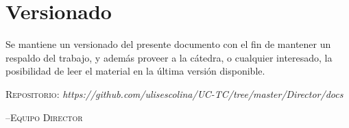 \documentclass{report}
\begin{document}
\newpage
\section*{Versionado}
Se mantiene un versionado del presente documento con el fin de mantener un
respaldo del trabajo, y además proveer a la cátedra, o cualquier interesado, la
posibilidad de leer el material en la última versión disponible.

\begin{center}
  \textsc{Repositorio}: \textit{https://github.com/ulisescolina/UC-TC/tree/master/Director/docs}
\end{center}

\hfill--\textsc{Equipo Director}
\tableofcontents
\listoffigures
\lstlistoflistings
{}
\newpage








\newpage
\printbibliography[title={Referencias}]
\end{document}
